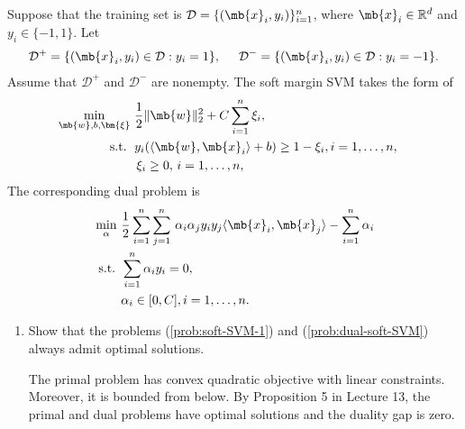 \begin{exercise}
    Suppose that the training set is $\mathcal{D}=\{ (\mb{x}_i,y_i) \}_{i=1}^n$, where $\mb{x}_i \in \mathbb{R}^d$ and $y_i \in \{ -1,1 \}$. Let
    \begin{align*}
        \mathcal{D}^+=\{(\mb{x}_i,y_i)\in\mathcal{D}:y_i=1\},\hspace{5mm}\mathcal{D}^-=\{(\mb{x}_i,y_i)\in\mathcal{D}:y_i=-1\}.
    \end{align*}
    Assume that $\mathcal{D}^+$ and $\mathcal{D}^-$ are nonempty.
    The soft margin SVM takes the form of
    \begin{align}\label{prob:soft-SVM-1}
        \begin{aligned}
            \min_{\mb{w},b,\bm{\xi}} \  & \frac{1}{2}\|\mb{w}\|^2_2+C\sum_{i=1}^n\xi_i,                   \\
            \text{ s.t. }            \, & y_i(\langle\mb{w},\mb{x}_i\rangle+b)\ge 1-\xi_i,i=1,\ldots,n, & \\
                                        & \,\xi_i\geq0,\,i=1,\ldots,n,
        \end{aligned}
    \end{align}
    The corresponding dual problem is
    \begin{align}\label{prob:dual-soft-SVM}
        \begin{aligned}
            \min_{\alpha} \  & \frac{1}{2}\sum_{i=1}^n\sum_{j=1}^n\,\alpha_i\alpha_jy_iy_j\langle\mb{x}_i,\mb{x}_j\rangle-\sum_{i=1}^n\alpha_i \\
            \text{ s.t. }    & \sum_{i=1}^n\alpha_iy_i=0,                                                                                      \\
                             & \alpha_i\in[0,C],i=1,\ldots,n.
        \end{aligned}
    \end{align}
    \begin{enumerate}
        \item Show that the problems (\ref{prob:soft-SVM-1}) and (\ref{prob:dual-soft-SVM}) always admit optimal solutions.


            \begin{solution}
                The primal problem has convex quadratic objective with linear constraints. Moreover, it is bounded from below. By Proposition 5 in Lecture 13, the primal and dual problems have optimal solutions and the duality gap is zero.
            \end{solution}



\end{enumerate}
\end{exercise}
